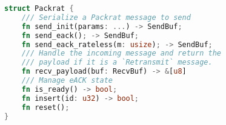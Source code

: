 \begin{lstfloat}[t]
\begin{lstlisting}[language=Rust]
struct Packrat {
    /// Serialize a Packrat message to send
    fn send_init(params: ...) -> SendBuf;
    fn send_eack(); -> SendBuf;
    fn send_eack_rateless(m: usize); -> SendBuf;
    /// Handle the incoming message and return the
    /// payload if it is a `Retransmit` message.
    fn recv_payload(buf: RecvBuf) -> &[u8]
    /// Manage eACK state
    fn is_ready() -> bool;
    fn insert(id: u32) -> bool;
    fn reset();
}
\end{lstlisting}
\label{lst:quacker-interface}
\end{lstfloat}
